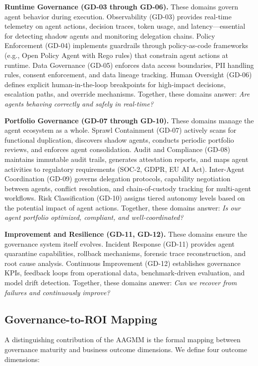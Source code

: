 \documentclass[ai,article,submit,pdftex,moreauthors]{Definitions/mdpi}
\begin{document}
\textbf{Runtime Governance (GD-03 through GD-06).} These domains govern agent behavior during execution. Observability (GD-03) provides real-time telemetry on agent actions, decision traces, token usage, and latency---essential for detecting shadow agents and monitoring delegation chains. Policy Enforcement (GD-04) implements guardrails through policy-as-code frameworks (e.g., Open Policy Agent with Rego rules) that constrain agent actions at runtime. Data Governance (GD-05) enforces data access boundaries, PII handling rules, consent enforcement, and data lineage tracking. Human Oversight (GD-06) defines explicit human-in-the-loop breakpoints for high-impact decisions, escalation paths, and override mechanisms. Together, these domains answer: \textit{Are agents behaving correctly and safely in real-time?}

\textbf{Portfolio Governance (GD-07 through GD-10).} These domains manage the agent ecosystem as a whole. Sprawl Containment (GD-07) actively scans for functional duplication, discovers shadow agents, conducts periodic portfolio reviews, and enforces agent consolidation. Audit and Compliance (GD-08) maintains immutable audit trails, generates attestation reports, and maps agent activities to regulatory requirements (SOC-2, GDPR, EU AI Act). Inter-Agent Coordination (GD-09) governs delegation protocols, capability negotiation between agents, conflict resolution, and chain-of-custody tracking for multi-agent workflows. Risk Classification (GD-10) assigns tiered autonomy levels based on the potential impact of agent actions. Together, these domains answer: \textit{Is our agent portfolio optimized, compliant, and well-coordinated?}

\textbf{Improvement and Resilience (GD-11, GD-12).} These domains ensure the governance system itself evolves. Incident Response (GD-11) provides agent quarantine capabilities, rollback mechanisms, forensic trace reconstruction, and root cause analysis. Continuous Improvement (GD-12) establishes governance KPIs, feedback loops from operational data, benchmark-driven evaluation, and model drift detection. Together, these domains answer: \textit{Can we recover from failures and continuously improve?}

\subsection{Governance-to-ROI Mapping}\label{sec:framework-roi}

A distinguishing contribution of the AAGMM is the formal mapping between governance maturity and business outcome dimensions. We define four outcome dimensions:
\end{document}
